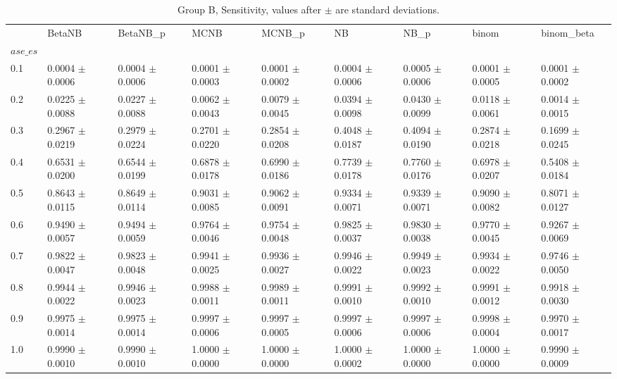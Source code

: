\begin{table}[H]
\centering
\begin{adjustbox}{max width=\linewidth}
\begin{tabular}{lllllllll}
\toprule
 & BetaNB & BetaNB\_p & MCNB & MCNB\_p & NB & NB\_p & binom & binom\_beta \\
$ase\_es$ &  &  &  &  &  &  &  &  \\
\midrule
0.1 & 0.0004 $\pm$ 0.0006 & 0.0004 $\pm$ 0.0006 & 0.0001 $\pm$ 0.0003 & 0.0001 $\pm$ 0.0002 & 0.0004 $\pm$ 0.0006 & 0.0005 $\pm$ 0.0006 & 0.0001 $\pm$ 0.0005 & 0.0001 $\pm$ 0.0002 \\
0.2 & 0.0225 $\pm$ 0.0088 & 0.0227 $\pm$ 0.0088 & 0.0062 $\pm$ 0.0043 & 0.0079 $\pm$ 0.0045 & 0.0394 $\pm$ 0.0098 & 0.0430 $\pm$ 0.0099 & 0.0118 $\pm$ 0.0061 & 0.0014 $\pm$ 0.0015 \\
0.3 & 0.2967 $\pm$ 0.0219 & 0.2979 $\pm$ 0.0224 & 0.2701 $\pm$ 0.0220 & 0.2854 $\pm$ 0.0208 & 0.4048 $\pm$ 0.0187 & 0.4094 $\pm$ 0.0190 & 0.2874 $\pm$ 0.0218 & 0.1699 $\pm$ 0.0245 \\
0.4 & 0.6531 $\pm$ 0.0200 & 0.6544 $\pm$ 0.0199 & 0.6878 $\pm$ 0.0178 & 0.6990 $\pm$ 0.0186 & 0.7739 $\pm$ 0.0178 & 0.7760 $\pm$ 0.0176 & 0.6978 $\pm$ 0.0207 & 0.5408 $\pm$ 0.0184 \\
0.5 & 0.8643 $\pm$ 0.0115 & 0.8649 $\pm$ 0.0114 & 0.9031 $\pm$ 0.0085 & 0.9062 $\pm$ 0.0091 & 0.9334 $\pm$ 0.0071 & 0.9339 $\pm$ 0.0071 & 0.9090 $\pm$ 0.0082 & 0.8071 $\pm$ 0.0127 \\
0.6 & 0.9490 $\pm$ 0.0057 & 0.9494 $\pm$ 0.0059 & 0.9764 $\pm$ 0.0046 & 0.9754 $\pm$ 0.0048 & 0.9825 $\pm$ 0.0037 & 0.9830 $\pm$ 0.0038 & 0.9770 $\pm$ 0.0045 & 0.9267 $\pm$ 0.0069 \\
0.7 & 0.9822 $\pm$ 0.0047 & 0.9823 $\pm$ 0.0048 & 0.9941 $\pm$ 0.0025 & 0.9936 $\pm$ 0.0027 & 0.9946 $\pm$ 0.0022 & 0.9949 $\pm$ 0.0023 & 0.9934 $\pm$ 0.0022 & 0.9746 $\pm$ 0.0050 \\
0.8 & 0.9944 $\pm$ 0.0022 & 0.9946 $\pm$ 0.0023 & 0.9988 $\pm$ 0.0011 & 0.9989 $\pm$ 0.0011 & 0.9991 $\pm$ 0.0010 & 0.9992 $\pm$ 0.0010 & 0.9991 $\pm$ 0.0012 & 0.9918 $\pm$ 0.0030 \\
0.9 & 0.9975 $\pm$ 0.0014 & 0.9975 $\pm$ 0.0014 & 0.9997 $\pm$ 0.0006 & 0.9997 $\pm$ 0.0005 & 0.9997 $\pm$ 0.0006 & 0.9997 $\pm$ 0.0006 & 0.9998 $\pm$ 0.0004 & 0.9970 $\pm$ 0.0017 \\
1.0 & 0.9990 $\pm$ 0.0010 & 0.9990 $\pm$ 0.0010 & 1.0000 $\pm$ 0.0000 & 1.0000 $\pm$ 0.0000 & 1.0000 $\pm$ 0.0002 & 1.0000 $\pm$ 0.0000 & 1.0000 $\pm$ 0.0000 & 0.9990 $\pm$ 0.0009 \\
\bottomrule
\end{tabular}

\end{adjustbox}
\caption{Group B, Sensitivity, values after $\pm$ are standard deviations.}
\end{table}

